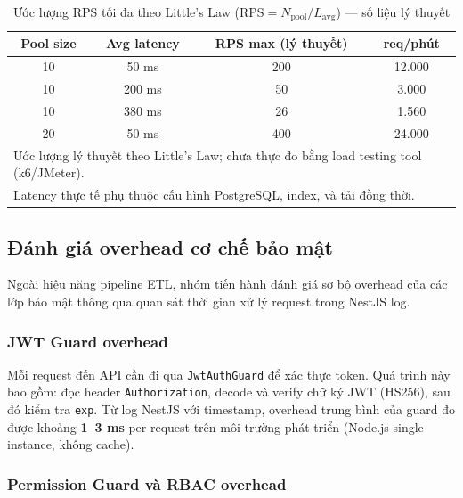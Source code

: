 \begin{table}[H]
\centering
\caption{Ước lượng RPS tối đa theo Little's Law
($\text{RPS} = N_\text{pool} / L_\text{avg}$) — số liệu lý thuyết}
\label{tab:rps-estimate}
\begin{tabular}{cccc}
\toprule
\textbf{Pool size} & \textbf{Avg latency} & \textbf{RPS max (lý thuyết)} & \textbf{req/phút} \\
\midrule
10 & 50 ms  & 200 & 12.000 \\
10 & 200 ms & 50  & 3.000  \\
10 & 380 ms & 26  & 1.560  \\
20 & 50 ms  & 400 & 24.000 \\
\bottomrule
\multicolumn{4}{l}{\footnotesize Ước lượng lý thuyết theo Little's Law;
chưa thực đo bằng load testing tool (k6/JMeter).} \\
\multicolumn{4}{l}{\footnotesize Latency thực tế phụ thuộc cấu hình
PostgreSQL, index, và tải đồng thời.}
\end{tabular}
\end{table}

\subsection{Đánh giá overhead cơ chế bảo mật}
\label{sec:perf-security}

Ngoài hiệu năng pipeline ETL, nhóm tiến hành đánh giá sơ bộ overhead
của các lớp bảo mật thông qua quan sát thời gian xử lý request trong
NestJS log.

\subsubsection{JWT Guard overhead}

Mỗi request đến API cần đi qua \texttt{JwtAuthGuard} để xác thực
token. Quá trình này bao gồm: đọc header \texttt{Authorization},
decode và verify chữ ký JWT (HS256), sau đó kiểm tra \texttt{exp}.
Từ log NestJS với timestamp, overhead trung bình của guard đo được
khoảng \textbf{1--3 ms} per request trên môi trường phát triển
(Node.js single instance, không cache).

\subsubsection{Permission Guard và RBAC overhead}

